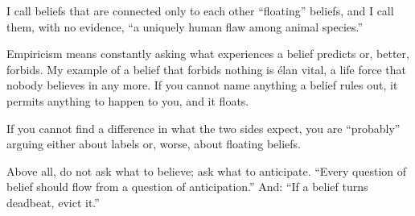 I call beliefs that are connected only to each other ``floating'' beliefs, and I call them, with no evidence, ``a uniquely human flaw among animal species.''

Empiricism means constantly asking what experiences a belief predicts or, better, forbids. My example of a belief that forbids nothing is élan vital, a life force that nobody believes in any more. If you cannot name anything a belief rules out, it permits anything to happen to you, and it floats. 

If you cannot find a difference in what the two sides expect, you are ``probably'' arguing either about labels or, worse, about floating beliefs.

Above all, do not ask what to believe; ask what to anticipate. ``Every question of belief should flow from a question of anticipation.''  And: ``If a belief turns deadbeat, evict it.''
